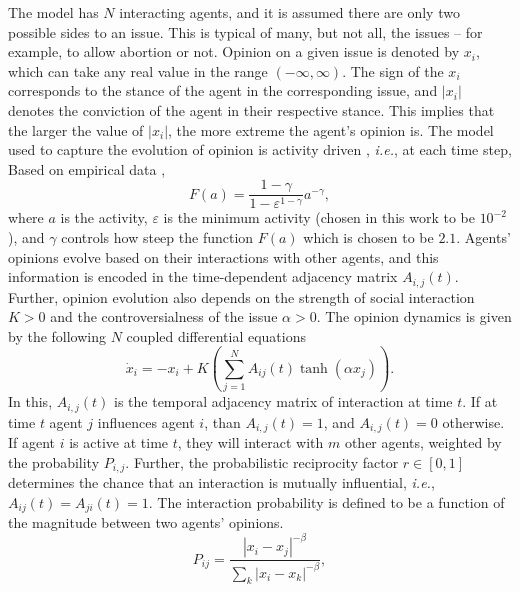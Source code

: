 \documentclass[%
 reprint,
superscriptaddress,
 amsmath,amssymb,
 aps,
 pre,
]{revtex4-1}
\begin{document}
The model has $N$ interacting agents, and it is assumed there are only two possible sides to an issue. This is typical of many, but not all, the issues -- for example, to allow abortion or not. Opinion on a given issue is denoted by $x_i$, which can take any real value in the range $(-\infty, \infty)$. The sign of the $x_i$ corresponds to the stance of the agent in the corresponding issue, and $|x_i|$ denotes the conviction of the agent in their respective stance. This implies that the larger the value of $|x_i|$, the more extreme the agent's opinion is. The model used to capture the evolution of opinion is activity driven \cite{activity-driven-modeling-of-time-varying-networks, topological-properties-of-time-integrated-activity-driven-netowork, burstiness-and-aging-in-social-temporal-networks, controlling-contagion-processes-in-activity-driven-networks}, {\it i.e.}, at each time step,  Based on empirical data \cite{activity-driven-modeling-of-time-varying-networks, burstiness-and-aging-in-social-temporal-networks}, 
\begin{equation}
    \label{activities.eq}
      F(a) = \frac{1-\gamma}{1-\varepsilon^{1-\gamma}} a^{-\gamma},
\end{equation}
where $a$ is the activity, $\varepsilon$ is the minimum activity (chosen in this work to be $10^{-2}$), and $\gamma$ controls how steep the function $F(a)$ which is chosen to be $2.1$. Agents' opinions evolve based on their interactions with other agents, and this information is encoded in the time-dependent adjacency matrix $A_{i, j}(t)$. Further, opinion evolution also depends on the strength of social interaction $K > 0$ and the controversialness of the issue $\alpha > 0$. The opinion dynamics is given by 
the following $N$ coupled differential equations \cite{modeling-echo-chambers-and-polarizaiton-dynamics-in-social-networks}
\begin{equation}
    \label{main.eq}
    \dot{x}_i= -x_i + K \left(\sum^{N}_{j=1} A_{ij} (t)  \tanh{(\alpha x_j)}\right).
\end{equation}
In this, $A_{i, j}(t)$ is the temporal adjacency matrix of interaction at time $t$. If at time $t$ agent $j$ influences agent $i$, than $A_{i, j}(t) = 1$, and $A_{i, j}(t) = 0$ otherwise. If agent $i$ is active at time $t$, they will interact with $m$ other agents, weighted by the probability $P_{i, j}$. Further, the probabilistic reciprocity factor $r \in [0, 1]$ determines the chance that an interaction is mutually influential, {\it i.e.}, $A_{ij}(t)=A_{ji}(t)=1$. The interaction probability is defined to be a function of the magnitude between two agents' opinions.
\begin{equation}
    \label{homophily.eq}
    {P_{ij} = \frac{|x_i - x_j|^{-\beta}}{\sum_k{|x_i - x_k|^{-\beta}}}},
\end{equation}
\end{document}
